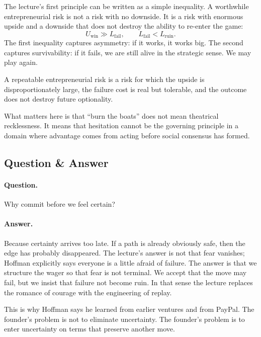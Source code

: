 The lecture's first principle can be written as a simple inequality. A worthwhile entrepreneurial risk is not a risk with no downside. It is a risk with enormous upside and a downside that does not destroy the ability to re-enter the game:
\begin{equation}
U_{\mathrm{win}} \gg L_{\mathrm{fail}}, \qquad L_{\mathrm{fail}} < L_{\mathrm{ruin}}.
\end{equation}
The first inequality captures asymmetry: if it works, it works big. The second captures survivability: if it fails, we are still alive in the strategic sense. We may play again.

\begin{definition}
A repeatable entrepreneurial risk is a risk for which the upside is disproportionately large, the failure cost is real but tolerable, and the outcome does not destroy future optionality.
\end{definition}

What matters here is that ``burn the boats'' does not mean theatrical recklessness. It means that hesitation cannot be the governing principle in a domain where advantage comes from acting before social consensus has formed.

\subsection{Question \& Answer}

\paragraph{Question.}
Why commit before we feel certain?

\paragraph{Answer.}
Because certainty arrives too late. If a path is already obviously safe, then the edge has probably disappeared. The lecture's answer is not that fear vanishes; Hoffman explicitly says everyone is a little afraid of failure. The answer is that we structure the wager so that fear is not terminal. We accept that the move may fail, but we insist that failure not become ruin. In that sense the lecture replaces the romance of courage with the engineering of replay.

This is why Hoffman says he learned from earlier ventures and from PayPal. The founder's problem is not to eliminate uncertainty. The founder's problem is to enter uncertainty on terms that preserve another move.

